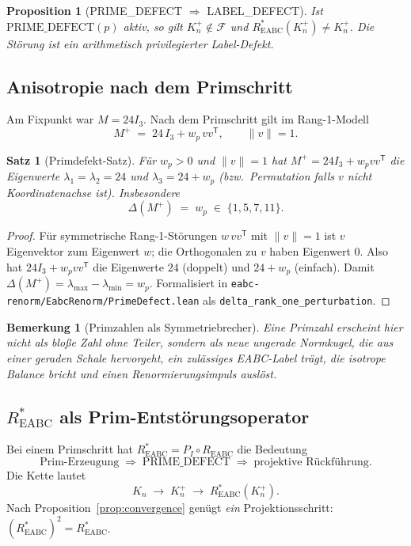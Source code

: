 \documentclass[11pt,a4paper]{article}
\newtheorem{theorem}{Satz}
\newtheorem{remark}{Bemerkung}
\newtheorem{proposition}{Proposition}
\begin{document}
	\begin{proposition}[PRIME\_DEFECT $\Rightarrow$ LABEL\_DEFECT]
		\label{prop:prime-implies-label}
		Ist $\text{PRIME\_DEFECT}(p)$ aktiv, so gilt $K_n^+\notin\mathcal{F}$ und
		$R^*_{\mathrm{EABC}}(K_n^+)\neq K_n^+$.
		Die Störung ist ein \emph{arithmetisch privilegierter} Label-Defekt.
	\end{proposition}
	
	\subsection{Anisotropie nach dem Primschritt}
	
	Am Fixpunkt war $M=24I_3$.
	Nach dem Primschritt gilt im Rang-1-Modell
	\[
	M^+ \;=\; 24\,I_3 + w_p\, v v^{\mathsf T},
	\qquad \|v\|=1.
	\]
	
	\begin{theorem}[Primdefekt-Satz]
		\label{thm:prime-delta}
		Für $w_p>0$ und $\|v\|=1$ hat $M^+=24I_3+w_p vv^{\mathsf T}$ die Eigenwerte
		$\lambda_1=\lambda_2=24$ und $\lambda_3=24+w_p$ (bzw.\ Permutation falls $v$ nicht
		Koordinatenachse ist).
		Insbesondere
		\[
		\Delta(M^+) \;=\; w_p \;\in\; \{1,5,7,11\}.
		\]
	\end{theorem}
	
	\begin{proof}
		Für symmetrische Rang-1-Störungen $w\,vv^{\mathsf T}$ mit $\|v\|=1$ ist $v$ Eigenvektor
		zum Eigenwert $w$; die Orthogonalen zu $v$ haben Eigenwert $0$.
		Also hat $24I_3+w_p vv^{\mathsf T}$ die Eigenwerte $24$ (doppelt) und $24+w_p$ (einfach).
		Damit $\Delta(M^+)=\lambda_{\max}-\lambda_{\min}=w_p$.
		Formalisiert in \texttt{eabc-renorm/EabcRenorm/PrimeDefect.lean}
		als \texttt{delta\_rank\_one\_perturbation}.
	\end{proof}
	
	\begin{remark}[Primzahlen als Symmetriebrecher]
		Eine Primzahl erscheint hier nicht als bloße Zahl ohne Teiler, sondern als
		\emph{neue ungerade Normkugel}, die aus einer geraden Schale hervorgeht,
		ein zulässiges EABC-Label trägt, die isotrope Balance bricht und einen
		Renormierungsimpuls auslöst.
	\end{remark}
	
	\subsection{$R^*_{\mathrm{EABC}}$ als Prim-Entstörungsoperator}
	
	Bei einem Primschritt hat $R^*_{\mathrm{EABC}}=P_I\circ R_{\mathrm{EABC}}$ die Bedeutung
	\[
	\text{Prim-Erzeugung}
	\;\Rightarrow\;
	\text{PRIME\_DEFECT}
	\;\Rightarrow\;
	\text{projektive Rückführung}.
	\]
	Die Kette lautet
	\[
	K_n \;\longrightarrow\; K_n^+ \;\longrightarrow\; R^*_{\mathrm{EABC}}(K_n^+).
	\]
	Nach Proposition~\ref{prop:convergence} genügt \emph{ein} Projektionsschritt:
	$(R^*_{\mathrm{EABC}})^2=R^*_{\mathrm{EABC}}$.
	
\end{document}
